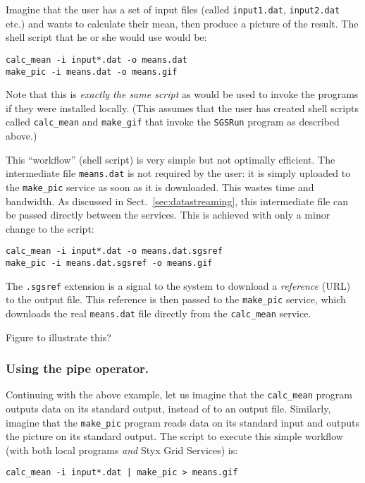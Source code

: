 \documentclass{llncs}
\begin{document}
Imagine that the user has a set of input files (called {\tt input1.dat}, {\tt input2.dat} etc.) and wants to calculate their mean, then produce a picture of the result.  The shell script that he or she would use would be:

\begin{verbatim}
calc_mean -i input*.dat -o means.dat
make_pic -i means.dat -o means.gif
\end{verbatim}

Note that this is {\em exactly the same script\/} as would be used to invoke the programs if they were installed locally.  (This assumes that the user has created shell scripts called {\tt calc\_mean} and {\tt make\_gif} that invoke the {\tt SGSRun} program as described above.)

This ``workflow'' (shell script) is very simple but not optimally efficient.  The intermediate file {\tt means.dat} is not required by the user: it is simply uploaded to the {\tt make\_pic} service as soon as it is downloaded.  This wastes time and bandwidth.  As discussed in Sect.~\ref{sec:datastreaming}, this intermediate file can be passed directly between the services.  This is achieved with only a minor change to the script:

\begin{verbatim}
calc_mean -i input*.dat -o means.dat.sgsref
make_pic -i means.dat.sgsref -o means.gif
\end{verbatim}

The {\tt .sgsref} extension is a signal to the system to download a {\em reference\/} (URL) to the output file.  This reference is then passed to the {\tt make\_pic} service, which downloads the real {\tt means.dat} file directly from the {\tt calc\_mean} service.

Figure to illustrate this?

\subsubsection{Using the pipe operator.}\label{sec:pipes}
Continuing with the above example, let us imagine that the {\tt calc\_mean} program outputs data on its standard output, instead of to an output file.  Similarly, imagine that the {\tt make\_pic} program reads data on its standard input and outputs the picture on its standard output.  The script to execute this simple workflow (with both local programs {\em and\/} Styx Grid Services) is:

\begin{verbatim}
calc_mean -i input*.dat | make_pic > means.gif
\end{verbatim}
\end{document}
